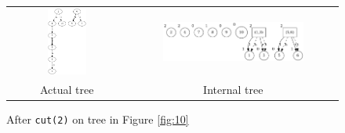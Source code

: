 \documentclass[a4paper, 11pt]{article}
\begin{document}
\begin{figure}[H]
\centering
\begin{tabular}{cc}
  \includegraphics[width=0.35\textwidth]{img/visualisations/test2/cut.png} & \includegraphics[width=0.7\textwidth]{img/visualisations/test2/icut.png} \\
  Actual tree & Internal tree \\
\end{tabular}
\caption{After \texttt{cut(2)} on tree in Figure \ref{fig:10}}
\label{fig:12}
\end{figure}
\end{document}
